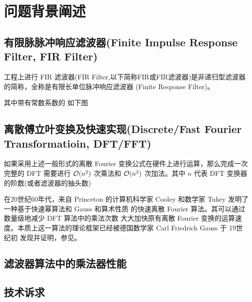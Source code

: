 \section{问题背景阐述}

\subsection{有限脉脉冲响应滤波器(Finite Impulse Response Filter, FIR Filter)}

工程上进行
FIR 滤波器(FIR Filter,以下简称FIR或FIR滤波器)是非递归型滤波器的简称，全称是有限长单位脉冲响应滤波器
(Finite Response Filter)。

其中带有常数系数的
如下图




\subsection{离散傅立叶变换及快速实现(Discrete/Fast Fourier Transformatioin, DFT/FFT)}

如果采用上述一般形式的离散 Fourier 变换公式在硬件上进行运算，那么完成一次完整的 DFT 需要进行
$\mathcal{O} (n^2)$ 次乘法和 $\mathcal{O}(n^2)$ 次加法。其中 $n$ 代表 DFT 变换器的阶数(或者滤波器的抽头数)

在20世纪60年代，来自 Princeton 的计算机科学家 Cooley 和数学家 Tukey 发明了一种基于快速幂算法和 Gauss 和算术性质
的快速离散 Fourier 算法。其可以通过数量级地减少 DFT 算法中的乘法次数
大大加快原有离散 Fourier 变换的运算速度。本质上这一算法的理论框架已经被德国数学家 Carl Friedrich Gauss 于 19世纪初
发现并证明，参见。

\subsection{滤波器算法中的乘法器性能}


\subsection{技术诉求}



